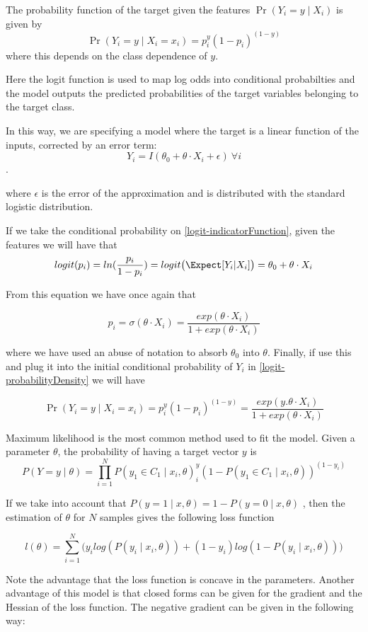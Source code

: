 The probability function of the target given the features $\Pr(Y_i=y\mid X_i)$ is given by 
$$\Pr(Y_i=y \mid X_i = x_i) = p_i^{y} (1-p_i)^{(1-y)}$$\label{logit-probabilityDensity}
where this depends on the class dependence of $y$.

Here the logit function is used to map log odds into conditional probabilties and the model outputs the predicted probabilities of the target variables belonging to the target class.

In this way, we are specifying a model where the target is a linear function of the inputs, corrected by an error term:
$$Y_i = I(\theta_0 + \theta \cdot X_i + \epsilon) \ \forall i$$. \label{logit-indicatorFunction}

where $\epsilon$ is the error of the approximation and is distributed with the standard logistic distribution. %

If we take the conditional probability on \ref{logit-indicatorFunction}, given the features we will have that
$$logit(p_i)= ln(\frac{p_i}{1-p_i}) = logit\big( \Expect[Y_i| X_i] \big) = 	\theta_0 + \theta \cdot X_i$$

From this equation we have once again that


$$p_i = \sigma(\theta \cdot X_i) = \frac{exp(\theta \cdot X_i) }{1 + exp(\theta \cdot X_i)}$$

where we have used an abuse of notation to absorb $\theta_0$ into $\theta$. Finally, if use this and plug it into the initial conditional probability of $Y_i$ in \ref{logit-probabilityDensity} we will have

$$  \Pr(Y_i=y \mid X_i = x_i) =  p_i^{y} (1-p_i)^{(1-y)} = \frac{exp(y . \theta \cdot X_i) }{1 + exp(\theta \cdot X_i)}$$


Maximum likelihood is the most common method used to fit the model. %
Given a parameter $\theta$, the probability of having a target vector $y$ is 
\[
P(Y =y \mid \theta )  = \prod_{i=1}^N P(y_1 \in C_1 \mid x_i, \theta)^y_i(1 - P(y_1 \in C_1 \mid x_i, \theta) )^{(1-y_i)}
\]

If we take into account that $P(y=1 \mid x,\theta) = 1 - P(y=0 \mid x,\theta)$ , then the estimation of $\theta$ for $N$ samples gives the following loss function

\[
l(\theta) = \sum_{i=1}^N \big(y_i log(P(y_i \mid x_i,\theta)) + (1-y_i)log(1 - P(y_i \mid x_i,\theta) ) \big)
\]

Note the advantage that the loss function is concave in the parameters. Another advantage of this model is that closed forms can be given for the gradient and the Hessian of the loss function. The negative gradient can be given in the following way: %

